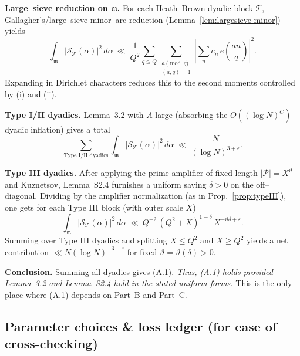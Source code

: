 \documentclass[11pt]{article}
\theoremstyle{definition}
\theoremstyle{remark}
\begin{document}
\medskip
\noindent\textbf{Large–sieve reduction on $\mathfrak m$.} For each Heath–Brown dyadic block $\mathcal T$, Gallagher’s/large–sieve minor–arc reduction (Lemma~\ref{lem:largesieve-minor}) yields
\[
	\int_{\mathfrak m}\big|\mathcal S_{\mathcal T}(\alpha)\big|^2\,d\alpha
	\ \ll\ \frac{1}{Q^2}\sum_{q\le Q}\sum_{\substack{a\!\!\!\pmod q\\(a,q)=1}}
	\left|\sum_n c_n\,e\!\left(\frac{an}{q}\right)\right|^2.
\]
Expanding in Dirichlet characters reduces this to the second moments controlled by (i) and (ii).

\medskip
\noindent\textbf{Type I/II dyadics.} Lemma~3.2 with $A$ large (absorbing the $O((\log N)^C)$ dyadic inflation) gives a total
\[
	\sum_{\text{Type I/II dyadics}}
	\int_{\mathfrak m}\big|\mathcal S_{\mathcal T}(\alpha)\big|^2\,d\alpha
	\ \ll\ \frac{N}{(\log N)^{3+\varepsilon}}.
\]

\medskip
\noindent\textbf{Type III dyadics.} After applying the prime amplifier of fixed length $|\mathcal P|=X^\vartheta$ and Kuznetsov, Lemma~S2.4 furnishes a uniform saving $\delta>0$ on the off–diagonal. Dividing by the amplifier normalization (as in Prop.~\ref{prop:typeIII}), one gets for each Type III block (with outer scale $X$)
\[
	\int_{\mathfrak m}\big|\mathcal S_{\mathcal T}(\alpha)\big|^2\,d\alpha
	\ \ll\ Q^{-2}\,(Q^2+X)^{1-\delta}\,X^{-\vartheta\delta+\varepsilon}.
\]
Summing over Type III dyadics and splitting $X\le Q^2$ and $X\ge Q^2$ yields a net contribution $\ll N(\log N)^{-3-\varepsilon}$ for fixed $\vartheta=\vartheta(\delta)>0$.

\medskip
\noindent\textbf{Conclusion.} Summing all dyadics gives (A.1). \emph{Thus, (A.1) holds provided Lemma~3.2 and Lemma~S2.4 hold in the stated uniform forms.} This is the only place where (A.1) depends on Part~B and Part~C.

\subsection*{Parameter choices \& loss ledger (for ease of cross-checking)}
\end{document}
